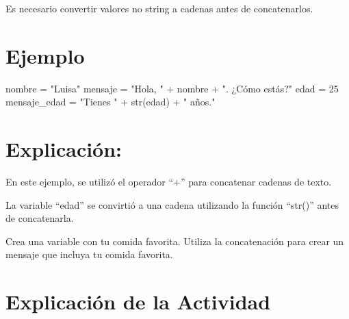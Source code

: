 \documentclass[
  a4paper,
  onepage,
  openany]{scrreprt}
\newenvironment{Shaded}{\begin{snugshade}}{\end{snugshade}}
\newcommand{\BuiltInTok}[1]{\textcolor[rgb]{0.00,0.23,0.31}{#1}}
\newcommand{\DecValTok}[1]{\textcolor[rgb]{0.68,0.00,0.00}{#1}}
\newcommand{\NormalTok}[1]{\textcolor[rgb]{0.00,0.23,0.31}{#1}}
\newcommand{\OperatorTok}[1]{\textcolor[rgb]{0.37,0.37,0.37}{#1}}
\newcommand{\StringTok}[1]{\textcolor[rgb]{0.13,0.47,0.30}{#1}}
\begin{document}
Es necesario convertir valores no string a cadenas antes de
concatenarlos.

\hypertarget{ejemplo-14}{%
\section{Ejemplo}\label{ejemplo-14}}

\begin{Shaded}
\begin{Highlighting}[]
\NormalTok{nombre }\OperatorTok{=} \StringTok{"Luisa"}
\NormalTok{mensaje }\OperatorTok{=} \StringTok{"Hola, "} \OperatorTok{+}\NormalTok{ nombre }\OperatorTok{+} \StringTok{". ¿Cómo estás?"}
\NormalTok{edad }\OperatorTok{=} \DecValTok{25}
\NormalTok{mensaje\_edad }\OperatorTok{=} \StringTok{"Tienes "} \OperatorTok{+} \BuiltInTok{str}\NormalTok{(edad) }\OperatorTok{+} \StringTok{" años."}
\end{Highlighting}
\end{Shaded}

\hypertarget{explicaciuxf3n-14}{%
\section{Explicación:}\label{explicaciuxf3n-14}}

En este ejemplo, se utilizó el operador ``+'' para concatenar cadenas de
texto.

La variable ``edad'' se convirtió a una cadena utilizando la función
``str()'' antes de concatenarla.

\begin{tcolorbox}[enhanced jigsaw, breakable, opacityback=0, toptitle=1mm, coltitle=black, toprule=.15mm, rightrule=.15mm, colframe=quarto-callout-important-color-frame, opacitybacktitle=0.6, arc=.35mm, title=\textcolor{quarto-callout-important-color}{\faExclamation}\hspace{0.5em}{Actividad Práctica:}, titlerule=0mm, colbacktitle=quarto-callout-important-color!10!white, bottomtitle=1mm, bottomrule=.15mm, colback=white, left=2mm, leftrule=.75mm]

Crea una variable con tu comida favorita. Utiliza la concatenación para
crear un mensaje que incluya tu comida favorita.

\end{tcolorbox}

\hypertarget{explicaciuxf3n-de-la-actividad-12}{%
\section{Explicación de la
Actividad}\label{explicaciuxf3n-de-la-actividad-12}}
\end{document}
